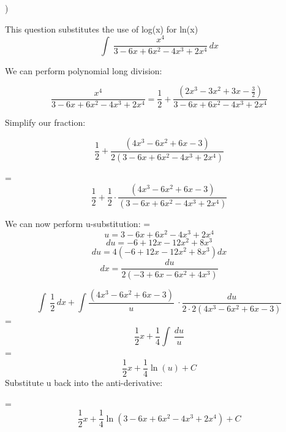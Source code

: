 \documentclass{article}
\begin{document}
)
\begin{flushleft}

\noindent *This question substitutes the use of log(x) for ln(x)
\[\int\ \frac{x^{4}}{3-6x+6x^{2}-4x^{3}+2x^{4}} \,dx \]

\noindent We can perform polynomial long division:

\[ \frac{x^{4}}{3-6x+6x^{2}-4x^{3}+2x^{4}} = \frac{1}{2} + \frac{\left(2x^{3}-3x^{2}+3x-\frac{3}{2}\right)}{3-6x+6x^{2}-4x^{3}+2x^{4}}\]

\noindent Simplify our fraction:

\[\frac{1}{2}+\frac{\left(4x^{3}-6x^{2}+6x-3\right)}{2\left(3-6x+6x^{2}-4x^{3}+2x^{4}\right)}\]

= \[\frac{1}{2}+\frac{1}{2} \cdot \frac{\left(4x^{3}-6x^{2}+6x-3\right)}{(3-6x+6x^{2}-4x^{3}+2x^{4})}\]

\noindent We can now perform u-substitution:
=\[u=3-6x+6x^{2}-4x^{3}+2x^{4}\]
\[du=-6+12x-12x^{2}+8x^{3}\]
\[du=4 (-6+12x-12x^{2}+8x^{3})dx\]
\[dx = \frac{du}{2\left(-3+6x-6x^{2}+4x^{3}\right)}\]

\[\int\ \frac{1}{2} \,dx + \int \frac{\left(4x^{3}-6x^{2}+6x-3\right)}{u}\ \cdot \frac{du} {2\cdot2\left(4x^{3}-6x^{2}+6x-3\right)}\]
=\[\frac{1}{2}x + \frac{1}{4}\int\ \frac{du}{u}\]
=\[\frac{1}{2}x + \frac{1}{4}\ln(u) + C\]
Substitute u back into the anti-derivative:

=\[\boxed{\frac{1}{2}x + \frac{1}{4}\ln(3-6x+6x^{2}-4x^{3}+2x^{4}) + C}\]
\end{flushleft}
\end{document}
